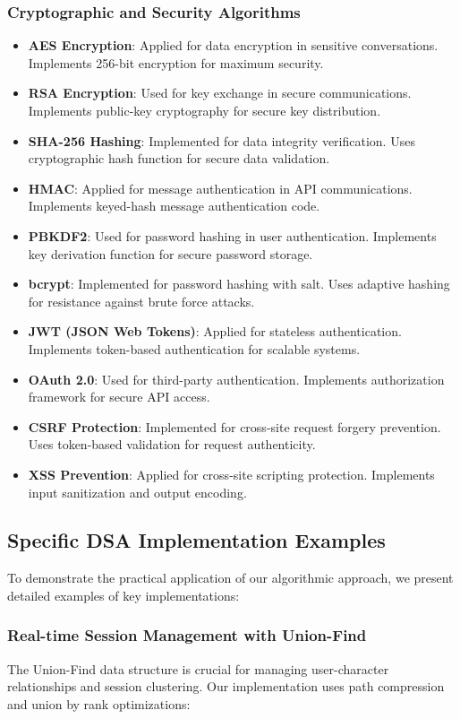 \documentclass[conference]{IEEEtran}
\begin{document}
\subsubsection{Cryptographic and Security Algorithms}
\begin{itemize}
\item \textbf{AES Encryption}: Applied for data encryption in sensitive conversations. Implements 256-bit encryption for maximum security.
\item \textbf{RSA Encryption}: Used for key exchange in secure communications. Implements public-key cryptography for secure key distribution.
\item \textbf{SHA-256 Hashing}: Implemented for data integrity verification. Uses cryptographic hash function for secure data validation.
\item \textbf{HMAC}: Applied for message authentication in API communications. Implements keyed-hash message authentication code.
\item \textbf{PBKDF2}: Used for password hashing in user authentication. Implements key derivation function for secure password storage.
\item \textbf{bcrypt}: Implemented for password hashing with salt. Uses adaptive hashing for resistance against brute force attacks.
\item \textbf{JWT (JSON Web Tokens)}: Applied for stateless authentication. Implements token-based authentication for scalable systems.
\item \textbf{OAuth 2.0}: Used for third-party authentication. Implements authorization framework for secure API access.
\item \textbf{CSRF Protection}: Implemented for cross-site request forgery prevention. Uses token-based validation for request authenticity.
\item \textbf{XSS Prevention}: Applied for cross-site scripting protection. Implements input sanitization and output encoding.
\end{itemize}

\subsection{Specific DSA Implementation Examples}
To demonstrate the practical application of our algorithmic approach, we present detailed examples of key implementations:

\subsubsection{Real-time Session Management with Union-Find}
The Union-Find data structure is crucial for managing user-character relationships and session clustering. Our implementation uses path compression and union by rank optimizations:
\end{document}
